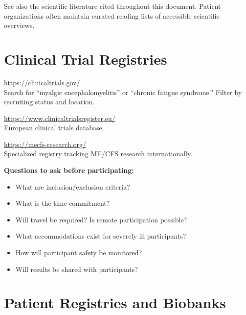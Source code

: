 See also the scientific literature cited throughout this document. Patient organizations often maintain curated reading lists of accessible scientific overviews.

\section{Clinical Trial Registries}
\label{sec:clinical-trials}

\begin{description}[style=nextline]
\item[ClinicalTrials.gov] \hfill \url{https://clinicaltrials.gov/}\\
Search for ``myalgic encephalomyelitis'' or ``chronic fatigue syndrome.'' Filter by recruiting status and location.

\item[EU Clinical Trials Register] \hfill \url{https://www.clinicaltrialsregister.eu/}\\
European clinical trials database.

\item[ME/CFS Research Register] \hfill \url{https://mecfs-research.org/}\\
Specialized registry tracking ME/CFS research internationally.
\end{description}

\textbf{Questions to ask before participating:}
\begin{itemize}
    \item What are inclusion/exclusion criteria?
    \item What is the time commitment?
    \item Will travel be required? Is remote participation possible?
    \item What accommodations exist for severely ill participants?
    \item How will participant safety be monitored?
    \item Will results be shared with participants?
\end{itemize}

\section{Patient Registries and Biobanks}
\label{sec:registries}


